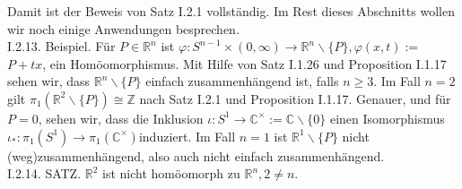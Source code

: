\documentclass[10pt]{article}
\begin{document}
Damit ist der Beweis von Satz I.2.1 vollständig. Im Rest dieses Abschnitts wollen wir noch einige Anwendungen besprechen.\\
I.2.13. Beispiel. Für $P \in \mathbb{R}^{n}$ ist $\varphi: S^{n-1} \times(0, \infty) \rightarrow \mathbb{R}^{n} \backslash\{P\}, \varphi(x, t):=$ $P+t x$, ein Homöomorphismus. Mit Hilfe von Satz I.1.26 und Proposition I.1.17 sehen wir, dass $\mathbb{R}^{n} \backslash\{P\}$ einfach zusammenhängend ist, falls $n \geq 3$. Im Fall $n=2$ gilt $\pi_{1}\left(\mathbb{R}^{2} \backslash\{P\}\right) \cong \mathbb{Z}$ nach Satz I.2.1 und Proposition I.1.17. Genauer, und für $P=0$, sehen wir, dass die Inklusion $\iota: S^{1} \rightarrow \mathbb{C}^{\times}:=\mathbb{C} \backslash\{0\}$ einen Isomorphismus $\iota_{*}: \pi_{1}\left(S^{1}\right) \rightarrow \pi_{1}\left(\mathbb{C}^{\times}\right)$induziert. Im Fall $n=1$ ist $\mathbb{R}^{1} \backslash\{P\}$ nicht (weg)zusammenhängend, also auch nicht einfach zusammenhängend.\\
I.2.14. SATZ. $\mathbb{R}^{2}$ ist nicht homöomorph zu $\mathbb{R}^{n}, 2 \neq n$.
\end{document}
